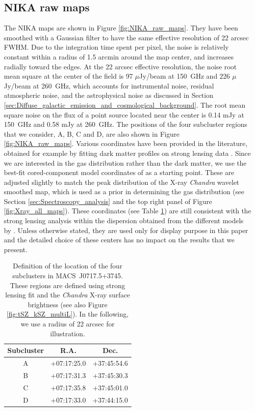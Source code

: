 \documentclass[twocolumn,traditabstract]{aa}
\begin{document}
\subsection{NIKA raw maps}\label{sec:NIKA_raw_maps}
The NIKA maps are shown in Figure \ref{fig:NIKA_raw_maps}. They have been smoothed with a Gaussian filter to have the same effective resolution of 22 arcsec FWHM. Due to the integration time spent per pixel, the noise is relatively constant within a radius of 1.5 arcmin around the map center, and increases radially toward the edges. At the 22 arcsec effective resolution, the noise root mean square at the center of the field is 97 $\mu$Jy/beam at 150~GHz and 226 $\mu$Jy/beam at 260~GHz, which accounts for instrumental noise, residual atmospheric noise, and the astrophysical noise as discussed in Section \ref{sec:Diffuse_galactic_emission_and_cosmological_background}. The root mean square noise on the flux of a point source located near the center is 0.14 mJy at 150~GHz and 0.58 mJy at 260~GHz. The positions of the four subcluster regions that we consider, A, B, C and D, are also shown in Figure \ref{fig:NIKA_raw_maps}. Various coordinates have been provided in the literature, obtained for example by fitting dark matter profiles on strong lensing data \citep[e.g.,][]{Limousin2012,Limousin2015}. Since we are interested in the gas distribution rather than the dark matter, we use the best-fit cored-component model coordinates of \cite{Limousin2015} as a starting point. These are adjusted slightly to match the peak distribution of the X-ray \textit{Chandra} wavelet smoothed map, which is used as a prior in determining the gas distribution (see Section \ref{sec:Spectroscopy_analysis} and the top right panel of Figure \ref{fig:Xray_all_maps}). These coordinates (see Table \ref{tab:coord_region}) are still consistent with the strong lensing analysis within the dispersion obtained from the different models by \cite{Limousin2015}. Unless otherwise stated, they are used only for display purpose in this paper and the detailed choice of these centers has no impact on the results that we present.

\begin{table}[]
\caption{\footnotesize{Definition of the location of the four subclusters in \mbox{MACS~J0717.5+3745}. These regions are defined using \cite{Limousin2015} strong lensing fit and the \textit{Chandra} X-ray surface brightness (see also Figure \ref{fig:tSZ_kSZ_multiL}). In the following, we use a radius of 22 arcsec for illustration.}}
\begin{center}
\begin{tabular}{ccc}
\hline
\hline
Subcluster & R.A. & Dec. \\
\hline
A & +07:17:25.0 & +37:45:54.6 \\
B & +07:17:31.3 & +37:45:30.3 \\
C & +07:17:35.8 & +37:45:01.0 \\
D & +07:17:33.0 & +37:44:15.0 \\
\hline
\end{tabular}
\end{center}
\label{tab:coord_region}
\end{table}
\end{document}
